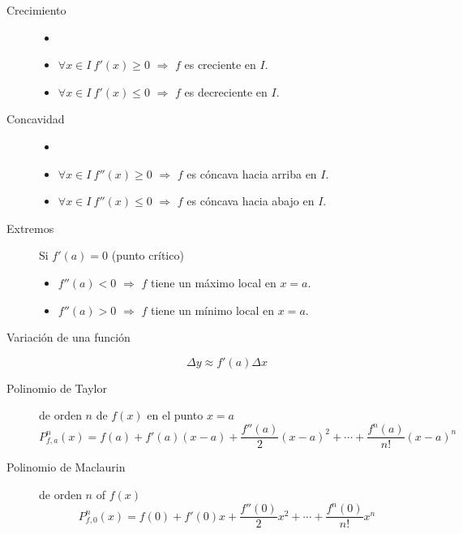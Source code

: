 \begin{multicols}{2}
\begin{tcolorbox}[hbox, title={Crecimiento, concavidad y extremos}]
\begin{minipage}{0.4\textwidth}
\flushleft
\begin{description}
\item[Crecimiento]
      \begin{itemize}
      \item[]
      \item $\forall x\in I\ f'(x)\geq 0$ $\Rightarrow$ $f$ es creciente en $I$.
      \item $\forall x\in I\ f'(x)\leq 0$ $\Rightarrow$ $f$ es decreciente en $I$.
      \end{itemize}
\item[Concavidad]
      \begin{itemize}
      \item[]
      \item $\forall x\in I\ f''(x)\geq 0$ $\Rightarrow$ $f$ es cóncava hacia arriba en $I$.
      \item $\forall x\in I\ f''(x)\leq 0$ $\Rightarrow$ $f$ es cóncava hacia abajo en $I$.
      \end{itemize}
\item[Extremos] Si $f'(a)=0$ (punto crítico)
      \begin{itemize}
      \item $f''(a)<0$ $\Rightarrow$ $f$ tiene un máximo local en $x=a$.
      \item $f''(a)>0$ $\Rightarrow$ $f$ tiene un mínimo local en $x=a$.
      \end{itemize}
\end{description}
\end{minipage}
\end{tcolorbox}

\begin{tcolorbox}[hbox, title=Aproximación de funciones]
\begin{minipage}{0.4\textwidth}
\flushleft
\begin{description}
\item[Variación de una función]
      \[
      \Delta y\approx f'(a)\Delta x
      \]
\item[Polinomio de Taylor] de orden $n$ de $f(x)$ en el punto $x=a$
      \[
      P^n_{f,a}(x)=f(a)+f'(a)(x-a)+\frac{f''(a)}{2}(x-a)^2+\cdots+\frac{f^n(a)}{n!}(x-a)^n
      \]
\item[Polinomio de Maclaurin] de orden $n$ of $f(x)$
      \[
      P^n_{f,0}(x)=f(0)+f'(0)x+\frac{f''(0)}{2}x^2+\cdots+\frac{f^n(0)}{n!}x^n
      \]
\end{description}
\end{minipage}
\end{tcolorbox}




\end{multicols}
